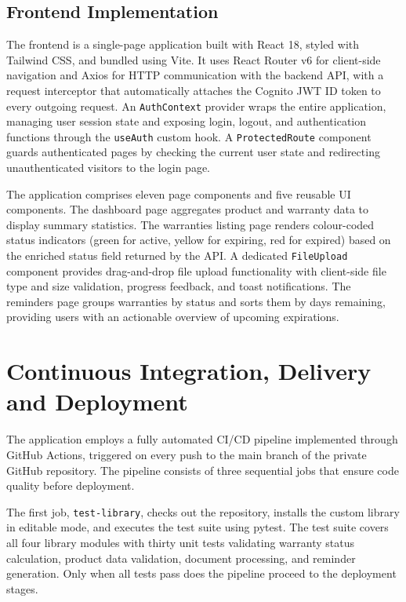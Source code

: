 \documentclass[conference]{IEEEtran}
\begin{document}
\subsection{Frontend Implementation}

The frontend is a single-page application built with React 18, styled with Tailwind CSS, and bundled using Vite. It uses React Router v6 for client-side navigation and Axios for HTTP communication with the backend API, with a request interceptor that automatically attaches the Cognito JWT ID token to every outgoing request. An \texttt{AuthContext} provider wraps the entire application, managing user session state and exposing login, logout, and authentication functions through the \texttt{useAuth} custom hook. A \texttt{ProtectedRoute} component guards authenticated pages by checking the current user state and redirecting unauthenticated visitors to the login page.

The application comprises eleven page components and five reusable UI components. The dashboard page aggregates product and warranty data to display summary statistics. The warranties listing page renders colour-coded status indicators (green for active, yellow for expiring, red for expired) based on the enriched status field returned by the API. A dedicated \texttt{FileUpload} component provides drag-and-drop file upload functionality with client-side file type and size validation, progress feedback, and toast notifications. The reminders page groups warranties by status and sorts them by days remaining, providing users with an actionable overview of upcoming expirations.

\section{Continuous Integration, Delivery and Deployment}

The application employs a fully automated CI/CD pipeline implemented through GitHub Actions, triggered on every push to the main branch of the private GitHub repository. The pipeline consists of three sequential jobs that ensure code quality before deployment.

The first job, \texttt{test-library}, checks out the repository, installs the custom library in editable mode, and executes the test suite using pytest. The test suite covers all four library modules with thirty unit tests validating warranty status calculation, product data validation, document processing, and reminder generation. Only when all tests pass does the pipeline proceed to the deployment stages.
\end{document}
